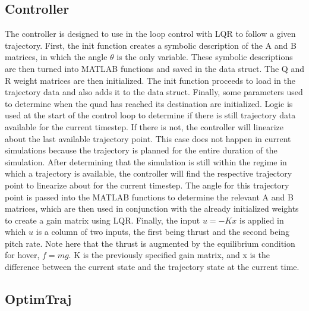 \documentclass[12pt]{article}
\begin{document}
\subsection{Controller}
The controller is designed to use in the loop control with LQR to follow a given trajectory. First, the init function creates a symbolic description of the A and B matrices, in which the angle $\theta$ is the only variable.  These symbolic descriptions are then turned into MATLAB functions and saved in the data struct.  The Q and R weight matrices are then initialized.  The init function proceeds to load in the trajectory data and also adds it to the data struct.  Finally, some parameters used to determine when the quad has reached its destination are initialized.
\newline
\newline
Logic is used at the start of the control loop to determine if there is still trajectory data available for the current timestep.  If there is not, the controller will linearize about the last available trajectory point.  This case does not happen in current simulations because the trajectory is planned for the entire duration of the simulation.
\newline
\newline
After determining that the simulation is still within the regime in which a trajectory is available, the controller will find the respective trajectory point to linearize about for the current timestep.  The angle for this trajectory point is passed into the MATLAB functions to determine the relevant A and B matrices, which are then used in conjunction with the already initialized weights to create a gain matrix using LQR.
\newline
\newline
Finally, the input $u = -Kx$ is applied in which $u$ is a column of two inputs, the first being thrust and the second being pitch rate.  Note here that the thrust is augmented by the equilibrium condition for hover, $f = mg$.  K is the previously specified gain matrix, and x is the difference between the current state and the trajectory state at the current time.

\subsection{OptimTraj}
\end{document}
